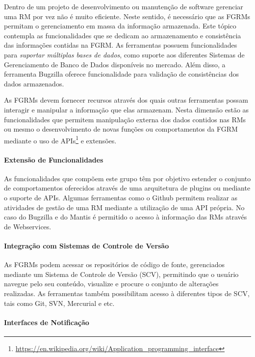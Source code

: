 Dentro de um projeto de desenvolvimento ou manutenção de software gerenciar uma
RM por vez não é muito eficiente. Neste sentido, é necessário que as FGRMs
permitam o gerenciamento em massa da informação armazenada. Este tópico
contempla as funcionalidades que se dedicam ao armazenamento e consistência das
informações contidas na FGRM\@. As ferramentas possuem funcionalidades para
\textit{suportar múltiplas bases de dados}, como suporte aos diferentes Sistemas
de Gerenciamento de Banco de Dados disponíveis no mercado. Além disso, a
ferramenta Bugzilla oferece funcionalidade para validação de consistências dos
dados armazenados.

As FGRMs devem fornecer recursos através dos quais outras ferramentas possam
interagir e manipular a informação que elas armazenam. Nesta dimensão estão as
funcionalidades que permitem manipulação externa dos dados contidos nas RMs ou
mesmo o desenvolvimento de novas funções ou comportamentos da FGRM mediante o
uso de
APIs\footnote{\url{https://en.wikipedia.org/wiki/Application_programming_interface}}
e extensões.

\paragraph{Extensão de Funcionalidades}
\label{par:extensão_de_funcionalidades}

As funcionalidades que compõem este grupo têm por objetivo estender o conjunto
de comportamentos oferecidos através de uma arquitetura de plugins ou mediante o
suporte de APIs. Algumas ferramentas como o Github permitem realizar as
atividades de gestão de uma RM mediante a utilização de uma API própria. No caso
do Bugzilla e do Mantis é permitido o acesso à informação das RMs através de
Webservices.

\paragraph{Integração com Sistemas de Controle de Versão}
\label{par:integração_com_sistemas_de_controle_de_versão}

As FGRMs podem acessar os repositórios de código de fonte, gerenciados mediante
um Sistema de Controle de Versão (SCV), permitindo que o usuário navegue pelo
seu conteúdo, visualize e procure o conjunto de alterações realizadas. As
ferramentas também possibilitam acesso à diferentes tipos de SCV, tais como Git,
SVN, Mercurial e etc.

\paragraph{Interfaces de Notificação}
\label{par:interfaces_de_notificação}

